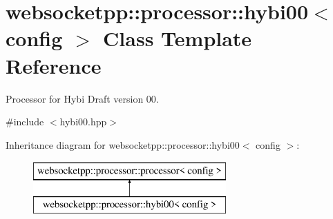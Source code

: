 \hypertarget{classwebsocketpp_1_1processor_1_1hybi00}{}\section{websocketpp\+:\+:processor\+:\+:hybi00$<$ config $>$ Class Template Reference}
\label{classwebsocketpp_1_1processor_1_1hybi00}


Processor for Hybi Draft version 00.  




{\ttfamily \#include $<$hybi00.\+hpp$>$}

Inheritance diagram for websocketpp\+:\+:processor\+:\+:hybi00$<$ config $>$\+:\begin{figure}[H]
\begin{center}
\leavevmode
\includegraphics[height=2.000000cm]{classwebsocketpp_1_1processor_1_1hybi00}
\end{center}
\end{figure}
